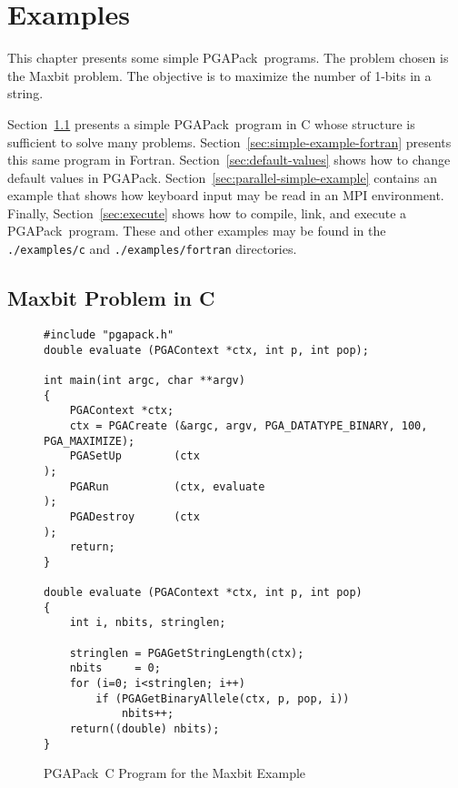 \documentclass{report}
\newcommand{\pga}{PGAPack}
\begin{document}
\chapter{Examples}\label{chp:examples}

This chapter presents some simple \pga\ programs.  The problem chosen is the
Maxbit problem.  The objective is to maximize the number of 1-bits in a
string.  

Section~\ref{sec:simple-example} presents a simple \pga\ program in C
whose structure is sufficient to solve many problems.
Section~\ref{sec:simple-example-fortran} presents this same program in Fortran.
Section~\ref{sec:default-values} shows how to change default values in \pga.
Section~\ref{sec:parallel-simple-example} contains an example that shows how
keyboard input may be read in an MPI environment.  Finally,
Section~\ref{sec:execute} shows how to compile, link, and execute a
\pga\ program.  These and other examples may be found in the {\tt
./examples/c} and {\tt ./examples/fortran} directories.



\section{Maxbit Problem in C}\label{sec:simple-example}

\begin{figure}
\begin{verbatim}
#include "pgapack.h"
double evaluate (PGAContext *ctx, int p, int pop);

int main(int argc, char **argv)
{
    PGAContext *ctx; 
    ctx = PGACreate (&argc, argv, PGA_DATATYPE_BINARY, 100, PGA_MAXIMIZE);
    PGASetUp        (ctx                                                );
    PGARun          (ctx, evaluate                                      );
    PGADestroy      (ctx                                                );
    return;
}

double evaluate (PGAContext *ctx, int p, int pop)
{
    int i, nbits, stringlen;

    stringlen = PGAGetStringLength(ctx);
    nbits     = 0;
    for (i=0; i<stringlen; i++)
        if (PGAGetBinaryAllele(ctx, p, pop, i))
            nbits++;
    return((double) nbits);
}
\end{verbatim}
\caption{\pga\ C Program for the Maxbit Example}\label{example:simple-main}
\end{figure}
\end{document}
